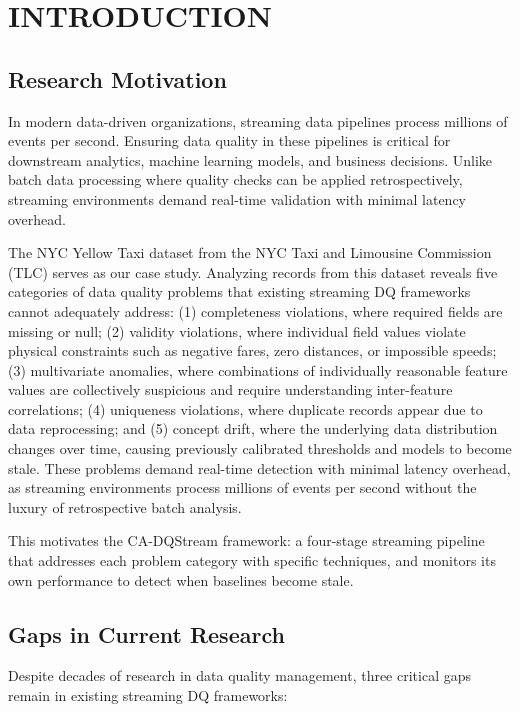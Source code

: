 \chapter{INTRODUCTION}
\pagestyle{fancy}

\section{Research Motivation}
In modern data-driven organizations, streaming data pipelines process millions of events per second. Ensuring data quality in these pipelines is critical for downstream analytics, machine learning models, and business decisions. Unlike batch data processing where quality checks can be applied retrospectively, streaming environments demand real-time validation with minimal latency overhead.

The NYC Yellow Taxi dataset from the NYC Taxi and Limousine Commission (TLC) serves as our case study. Analyzing records from this dataset reveals five categories of data quality problems that existing streaming DQ frameworks cannot adequately address: (1) completeness violations, where required fields are missing or null; (2) validity violations, where individual field values violate physical constraints such as negative fares, zero distances, or impossible speeds; (3) multivariate anomalies, where combinations of individually reasonable feature values are collectively suspicious and require understanding inter-feature correlations; (4) uniqueness violations, where duplicate records appear due to data reprocessing; and (5) concept drift, where the underlying data distribution changes over time, causing previously calibrated thresholds and models to become stale. These problems demand real-time detection with minimal latency overhead, as streaming environments process millions of events per second without the luxury of retrospective batch analysis.

This motivates the CA-DQStream framework: a four-stage streaming pipeline that addresses each problem category with specific techniques, and monitors its own performance to detect when baselines become stale.

\section{Gaps in Current Research}
Despite decades of research in data quality management, three critical gaps remain in existing streaming DQ frameworks:

